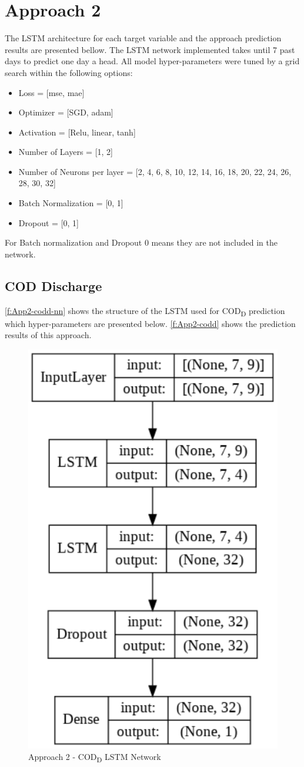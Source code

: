 \section{Approach 2}
The \ac{LSTM} architecture for each target variable and the approach prediction results are presented bellow. The \ac{LSTM} network implemented takes until 7 past days to predict one day a head.
All model hyper-parameters were tuned by a grid search within the following options:

\begin{itemize}
    \item Loss = [mse, mae]
    \item Optimizer = [SGD, adam]
    \item Activation = [Relu, linear, tanh]
    \item Number of Layers = [1, 2]
    \item Number of Neurons per layer = [2, 4, 6, 8, 10, 12, 14, 16, 18, 20, 22, 24, 26, 28, 30, 32]
    \item Batch Normalization = [0, 1]
    \item Dropout = [0, 1]
\end{itemize}

For Batch normalization and Dropout 0 means they are not included in the network.

\subsection{COD Discharge}
\autoref{f:App2-codd-nn} shows the structure of the \ac{LSTM} used for \ac{COD}\textsubscript{D} prediction which hyper-parameters are presented below. \autoref{f:App2-codd} shows the prediction results of this approach.

\begin{figure}[h]
\centering
 \includegraphics[width=0.4\linewidth]{figures/Ch5/App2_CODd.pdf}
\caption{Approach 2 - COD\textsubscript{D} LSTM Network}
\label{f:App2-codd-nn}
\end{figure}

